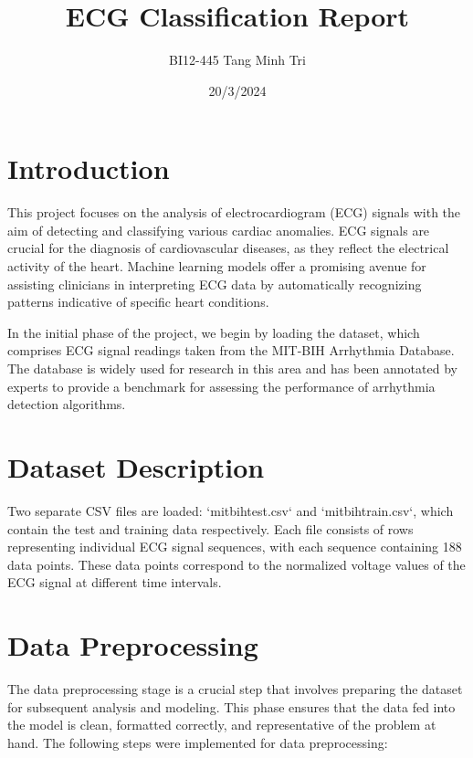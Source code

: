 \documentclass{report}
\title{ECG Classification Report}
\author{BI12-445 Tang Minh Tri}
\date{20/3/2024}
\begin{document}

\section{Introduction}


This project focuses on the analysis of electrocardiogram (ECG) signals with the aim of detecting and classifying various cardiac anomalies. ECG signals are crucial for the diagnosis of cardiovascular diseases, as they reflect the electrical activity of the heart. Machine learning models offer a promising avenue for assisting clinicians in interpreting ECG data by automatically recognizing patterns indicative of specific heart conditions.

In the initial phase of the project, we begin by loading the dataset, which comprises ECG signal readings taken from the MIT-BIH Arrhythmia Database. The database is widely used for research in this area and has been annotated by experts to provide a benchmark for assessing the performance of arrhythmia detection algorithms.


\section{Dataset Description}

 Two separate CSV files are loaded: `mitbihtest.csv` and `mitbihtrain.csv`, which contain the test and training data respectively. Each file consists of rows representing individual ECG signal sequences, with each sequence containing 188 data points. These data points correspond to the normalized voltage values of the ECG signal at different time intervals. 

\section{Data Preprocessing}
 
The data preprocessing stage is a crucial step that involves preparing the dataset for subsequent analysis and modeling. This phase ensures that the data fed into the model is clean, formatted correctly, and representative of the problem at hand. The following steps were implemented for data preprocessing:
\end{document}
